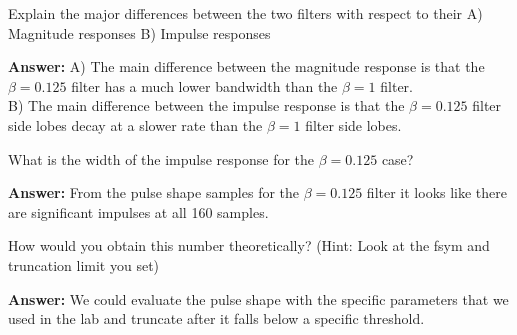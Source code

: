 \documentclass{article}
\begin{document}
\begin{enumerate}
  \begin{item}
  Explain the major differences between the two filters with respect to their
    A) Magnitude responses 
    B) Impulse responses

  \textbf{Answer:}
    A) The main difference between the magnitude response is that the $\beta = 0.125$ filter has
    a much lower bandwidth than the $\beta = 1$ filter.\\

    B) The main difference between the impulse response is that the $\beta = 0.125$ filter
    side lobes decay at a slower rate than the $\beta = 1$ filter side lobes.
  \end{item}

  \begin{item}
    What is the width of the impulse response for the $\beta = 0.125$ case? 

  \textbf{Answer:}
    From the pulse shape samples for the $\beta = 0.125$ filter it looks like there are significant impulses at all 160 samples.
  \end{item}

  \begin{item}
    How would you obtain this number theoretically? (Hint: Look at the fsym and truncation limit you set)

  \textbf{Answer:}
    We could evaluate the pulse shape with the specific parameters that we used in the lab and truncate after it falls below a specific threshold.
  \end{item}

\end{enumerate}
\end{document}
